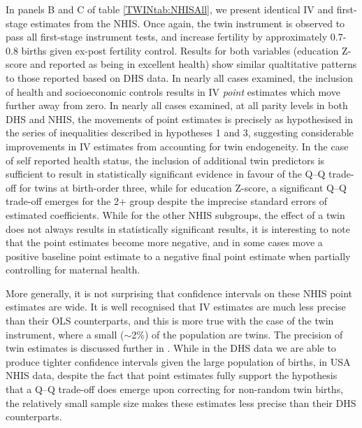 \documentclass[subeqn]{article}
\begin{document}
\begin{spacing}{1.4}
In panels B and C of table \ref{TWINtab:NHISAll}, we present identical IV and
first-stage estimates from the NHIS.  Once again, the twin instrument is
observed to pass all first-stage instrument tests, and increase fertility by
approximately 0.7-0.8 births given ex-post fertility control.  Results for both
variables (education Z-score and reported as being in excellent health) show
similar qualtitative patterns to those reported based on DHS data.  In nearly
all cases examined, the inclusion of health and socioeconomic controls results
in IV \emph{point} estimates which move further away from zero. In nearly all
cases examined, at all parity levels in both DHS and NHIS, the movements of
point estimates is precisely as hypothesised in the series of inequalities
described in hypotheses 1 and 3, suggesting considerable improvements in IV
estimates from accounting for twin endogeneity.  In the case of self reported
health status, the inclusion of additional twin predictors is sufficient to
result in statistically significant evidence in favour of the Q--Q trade-off for
twins at birth-order three, while for education Z-score, a significant Q--Q
trade-off emerges for the 2+ group despite the imprecise standard errors of
estimated coefficients. While for the other NHIS subgroups, the effect of a
twin does not always results in statistically significant results, it is
interesting to note that the point estimates become more negative, and in
some cases move a positive baseline point estimate to a negative final point
estimate when partially controlling for maternal health.

More generally, it is not surprising that confidence intervals on these NHIS
point estimates are wide.  It is well recognised that IV estimates are much
less precise than their OLS counterparts, and this is more true with the case
of the twin instrument, where a small ($\sim$2\%) of the population are twins.
The precision of twin estimates is discussed further in \citet{Angristetal2010}.
While in the DHS data we are able to produce tighter confidence intervals given
the large population of births, in USA NHIS data, despite the fact that point 
estimates fully support the hypothesis that a Q--Q trade-off does emerge upon 
correcting for non-random twin births, the relatively small sample size makes 
these estimates less precise than their DHS counterparts.


\end{spacing}
\end{document}
